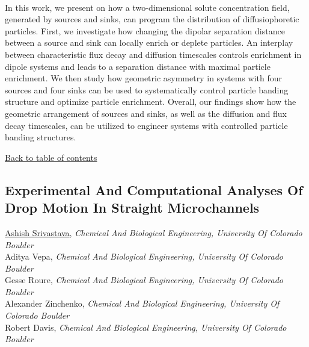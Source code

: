 \noindent  \\ 
\noindent In this work, we present on how a two-dimensional solute concentration field, generated by sources and sinks, can program the distribution of diffusiophoretic particles. First, we investigate how changing the dipolar separation distance between a source and sink can locally enrich or deplete particles. An interplay between characteristic flux decay and diffusion timescales controls enrichment in dipole systems and leads to a separation distance with maximal particle enrichment. We then study how geometric asymmetry in systems with four sources and four sinks can be used to systematically control particle banding structure and optimize particle enrichment. Overall, our findings show how the geometric arrangement of sources and sinks, as well as the diffusion and flux decay timescales, can be utilized to engineer systems with controlled particle banding structures. \\ 
\begin{flushright}\vspace{-0.2 in}\hyperlink{toc}{Back to table of contents}\end{flushright}\vspace{-0.2 in}
\hypertarget{AshishSrivastava}{\subsection*{\color{CUGOLD} Experimental And Computational Analyses Of Drop Motion In Straight Microchannels}} \vsp 
\underline{Ashish Srivastava}, \textit{Chemical And Biological Engineering, University Of Colorado Boulder}\\ 
{Aditya Vepa}, \textit{Chemical And Biological Engineering, University Of Colorado Boulder}\\ 
{Gesse Roure}, \textit{Chemical And Biological Engineering, University Of Colorado Boulder}\\ 
{Alexander Zinchenko}, \textit{Chemical And Biological Engineering, University Of Colorado Boulder}\\ 
{Robert Davis}, \textit{Chemical And Biological Engineering, University Of Colorado Boulder}\\ 
\vspace{-0.1 in} \\ 
